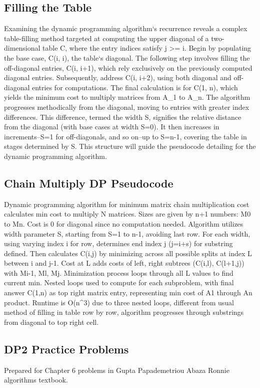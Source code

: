 \subsection*{Filling the Table}
Examining the dynamic programming algorithm`s recurrence reveals a complex table-filling method targeted at computing the upper diagonal of a two-dimensional table C, where the entry indices satisfy j \textgreater{}= i.
Begin by populating the base case, C(i, i), the table`s diagonal.
The following step involves filling the off-diagonal entries, C(i, i+1), which rely exclusively on the previously computed diagonal entries.
Subsequently, address C(i, i+2), using both diagonal and off-diagonal entries for computations.
The final calculation is for C(1, n), which yields the minimum cost to multiply matrices from A\_1 to A\_n.
The algorithm progresses methodically from the diagonal, moving to entries with greater index differences.
This difference, termed the width S, signifies the relative distance from the diagonal (with base cases at width S=0).
It then increases in increments--S=1 for off-diagonals, and so on--up to S=n-1, covering the table in stages determined by S\@.
This structure will guide the pseudocode detailing for the dynamic programming algorithm.

\subsection*{Chain Multiply  DP Pseudocode}
Dynamic programming algorithm for minimum matrix chain multiplication cost calculates min cost to multiply N matrices.
Sizes are given by n+1 numbers: M0 to Mn.
Cost is 0 for diagonal since no computation needed.
Algorithm utilizes width parameter S, starting from S=1 to n-1, avoiding last row.
For each width, using varying index i for row, determines end index j (j=i+s) for substring defined.
Then calculates C(i,j) by minimizing across all possible splits at index L between i and j-1.
Cost at L adds costs of left, right subtrees (C(i,l), C(l+1,j)) with Mi-1, Ml, Mj.
Minimization process loops through all L values to find current min.
Nested loops used to compute for each subproblem, with final answer C(1,n) as top right matrix entry, representing min cost of A1 through An product.
Runtime is O(n\textasciicircum{}3) due to three nested loops, different from usual method of filling in table row by row, algorithm progresses through substrings from diagonal to top right cell.

\subsection*{DP2  Practice Problems}
Prepared for Chapter 6 problems in Gupta Papademetriou Abaza Ronnie algorithms textbook.

